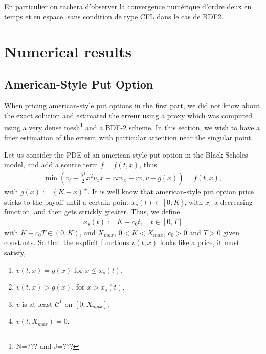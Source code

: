 \documentclass[12pt,a4paper]{article}
\begin{document}
En particulier on tachera d’observer la convergence numérique d’ordre deux en temps et en espace, sans condition de type CFL dans le cas de BDF2.

	\section{Numerical results}

		\subsection{American-Style Put Option}

When pricing american-style put options in the first part, we did not know about the exact solution and estimated the erreur using a proxy which was computed using a very dense mesh\footnote{N=??? and J=???} and a BDF-2 scheme. In this section, we wish to have a finer estimation of the erreur, with particular attention near the singular point.

Let us consider the PDE of an american-style put option in the Black-Scholes model, and add a source term $f = f(t,x)$, thus 
\begin{align}
	\min \left( v_t - \frac{\lambda^2}{2} x^2 v_xx - r x v_x + r v, v - g(x) \right) = f(t,x), \label{eq-PDE_ameroption_source}
\end{align} 
with $g(x) := (K-x)^+$. It is well know that american-style put option price sticks to the payoff until a certain point $x_s(t) \in [0; K]$, with $x_s$ a decreasing function, and then gets strickly greater. Thus, we define
\begin{align*}
	x_s(t) := K - c_0 t,  \quad t \in [0,T]
\end{align*}
with $K-c_0T \in (0, K)$, and $X_{max}$, $0<K<X_{max}$, $c_0>0$ and $T>0$ given constants. So that the explicit functions $v(t,x)$ looks like a price, it must satisfy,
\small{
\begin{enumerate}
	\item $v(t,x) = g(x)$ for $x \leq x_s(t)$,
	\item $v(t,x) > g(x)$, for $x > x_s(t)$,
	\item $v$ is at least $\mathcal{C}^1$ on $[0, X_{max}]$,
	\item $v(t,X_{max}) = 0$.
\end{enumerate}}
\end{document}
